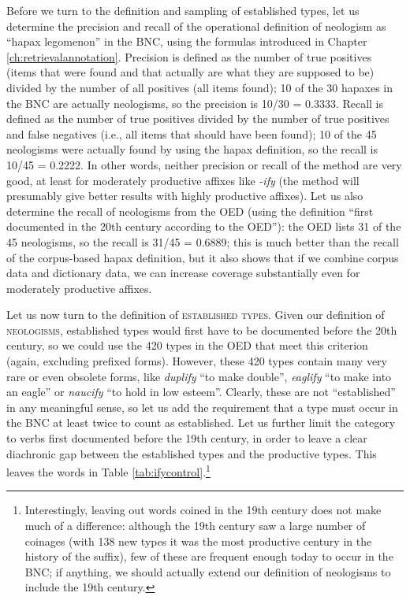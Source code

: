 Before we turn to the definition and sampling of established types, let us determine the precision and recall of the operational definition of neologism as ``hapax legomenon'' in the BNC, using the formulas introduced in Chapter \ref{ch:retrievalannotation}. Precision is defined as the number of true positives (items that were found and that actually are what they are supposed to be) divided by the number of all positives (all items found); 10 of the 30 hapaxes in the BNC are actually neologisms, so the precision is 10/30 = 0.3333. Recall is defined as the number of true positives divided by the number of true positives and false negatives (i.e., all items that should have been found); 10 of the 45 neologisms were actually found by using the hapax definition, so the recall is 10/45 = 0.2222. In other words, neither precision or recall of the method are very good, at least for moderately productive affixes like \textit{-ify} (the method will presumably give better results with highly productive affixes). Let us also determine the recall of neologisms from the OED (using the definition ``first documented in the 20th century according to the OED''): the OED lists 31 of the 45 neologisms, so the recall is 31/45 = 0.6889; this is much better than the recall of the corpus-based hapax definition, but it also shows that if we combine corpus data and dictionary data, we can increase coverage substantially even for moderately productive affixes.

Let us now turn to the definition of \textsc{established types}. Given our definition of \textsc{neologisms}, established types would first have to be documented before the 20th century, so we could use the 420 types in the OED that meet this criterion (again, excluding prefixed forms). However, these 420 types contain many very rare or even obsolete forms, like \textit{duplify} ``to make double'', \textit{eaglify} ``to make into an eagle'' or \textit{naucify} ``to hold in low esteem''. Clearly, these are not ``established'' in any meaningful sense, so let us add the requirement that a type must occur in the BNC at least twice to count as established. Let us further limit the category to verbs first documented before the 19th century, in order to leave a clear diachronic gap between the established types and the productive types. This leaves the words in Table \ref{tab:ifycontrol}.\footnote{Interestingly, leaving out words coined in the 19th century does not make much of a difference: although the 19th century saw a large number of coinages (with 138 new types it was the most productive century in the history of the suffix), few of these are frequent enough today to occur in the BNC; if anything, we should actually extend our definition of neologisms to include the 19th century.}

